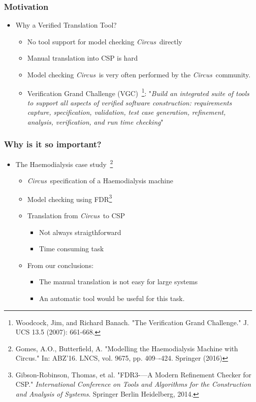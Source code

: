 \documentclass{beamer}
\def\Circus{{\sf\slshape{Circus}}}
\begin{document}
\begin{frame}
\frametitle{Motivation}
\begin{itemize}
  \item Why a Verified Translation Tool?
  \begin{itemize}
    \item No tool support for model checking \Circus\ directly
    \item Manual translation into CSP is hard
    \item Model checking \Circus\ is very often performed by the \Circus\ community.
    \item Verification Grand Challenge (VGC)~\footnote{Woodcock, Jim, and Richard Banach. "The Verification Grand Challenge." J. UCS 13.5 (2007): 661-668.}: "\emph{Build an integrated suite of tools to support all aspects of verified software construction: requirements capture, specification, validation, test case generation, refinement, analysis, verification, and run time checking}"
  \end{itemize}
\end{itemize}

\end{frame}
\begin{frame}
\frametitle{Why is it so important?}
\begin{itemize}
  \item The Haemodialysis case study~\footnote{Gomes, A.O., Butterfield, A. "Modelling the Haemodialysis Machine with Circus."
In: ABZ’16. LNCS, vol. 9675, pp. 409–-424. Springer (2016)}
  \begin{itemize}
    \item \Circus\ specification of a Haemodialysis machine
    \item Model checking using FDR\footnote{Gibson-Robinson, Thomas, et al. "FDR3-—A Modern Refinement Checker for CSP." \emph{International Conference on Tools and Algorithms for the Construction and Analysis of Systems}. Springer Berlin Heidelberg, 2014.}
    \item Translation from \Circus\ to CSP
      \begin{itemize}
        \item Not always straigthforward
        \item Time consuming task
      \end{itemize}
  \item From our conclusions:
      \begin{itemize}
        \item The manual translation is not easy for large systems
        \item An automatic tool would be useful for this task.
      \end{itemize}
  \end{itemize}
\end{itemize}

\end{frame}
\end{document}
